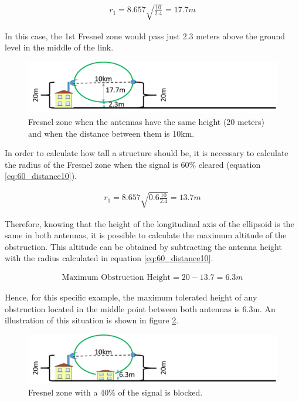 \begin{align}
r_1 = 8.657\sqrt{\frac{10}{2.4}} = 17.7m\label{eq:100_distance10}
\end{align}

In this case, the 1st Fresnel zone would pass just 2.3 meters above the ground level in the middle of the link. 

\begin{figure}[H]
	\centering
	\includegraphics[scale=0.50]{figures/fresnel_10km_height.png}
	\caption{Fresnel zone when the antennas have the same height (20 meters) and when the distance between them is 10km.}
	\label{fig:fresnel_zones_10km_height}
\end{figure}  

In order to calculate how tall a structure should be, it is necessary to calculate the radius of the Fresnel zone when the signal is 60$\%$ cleared (equation \ref{eq:60_distance10}).

\begin{align}
r_1 = 8.657\sqrt{0.6 \frac{10}{2.4}} = 13.7m\label{eq:60_distance10}
\end{align}
  
Therefore, knowing that the height of the longitudinal axis of the ellipsoid is the same in both antennas, it is possible to calculate the maximum altitude of the obstruction. This altitude can be obtained by subtracting the antenna height with the radius calculated in equation \ref{eq:60_distance10}.

\begin{align}
\text{Maximum Obstruction Height} = 20 - 13.7 = 6.3m\label{eq:height_obstruction}
\end{align}

Hence, for this specific example, the maximum tolerated height of any obstruction located in the middle point between both antennas is 6.3m. An illustration of this situation is shown in figure \ref{fig:fresnel_zones_10km_60procent}.

\begin{figure}[H]
	\centering
	\includegraphics[scale=0.50]{figures/fresnel_10km_60procent.png}
	\caption{Fresnel zone with a 40$\%$ of the signal is blocked.}
	\label{fig:fresnel_zones_10km_60procent}
\end{figure}  

